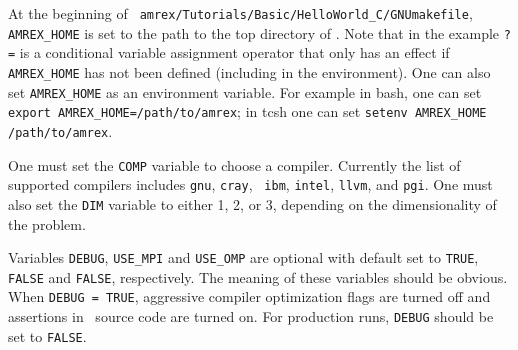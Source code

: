 At the beginning of {\tt
  amrex/Tutorials/Basic/HelloWorld\_C/GNUmakefile}, {\tt AMREX\_HOME}
is set to the path to the top directory of \amrex.  Note that in the
example {\tt ?=} is a conditional variable assignment operator that
only has an effect if {\tt AMREX\_HOME} has not been defined
(including in the environment).  One can also set {\tt AMREX\_HOME} 
as an environment variable.  For example in bash, 
one can set {\tt export AMREX\_HOME=/path/to/amrex}; in tcsh one can set
{\tt setenv AMREX\_HOME /path/to/amrex}.

One must set the {\tt COMP} variable to choose a compiler.  Currently
the list of supported compilers includes {\tt gnu}, {\tt cray}, {\tt
  ibm}, {\tt intel}, {\tt llvm}, and {\tt pgi}.  One must also set the
{\tt DIM} variable to either 1, 2, or 3, depending on the
dimensionality of the problem.

Variables {\tt DEBUG}, {\tt USE\_MPI} and {\tt USE\_OMP} are optional
with default set to {\tt TRUE}, {\tt FALSE} and {\tt FALSE},
respectively.  The meaning of these variables should be obvious.  
When {\tt DEBUG = TRUE}, aggressive compiler optimization flags are turned
off and assertions in \amrex\ source code are turned on.  For
production runs, {\tt DEBUG} should be set to {\tt FALSE}.


